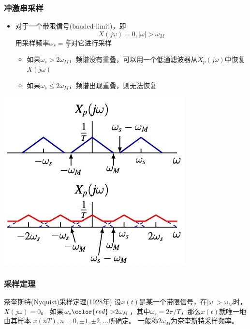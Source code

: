 \documentclass[CJKutf8,xcolor=pdftex,dvipsnames,table]{beamer}
\begin{document}
\begin{CJK*}{UTF8}{song}
  \begin{frame}
    \frametitle{冲激串采样}
    \begin{itemize}
    \item 对于一个带限信号(banded-limit)，即
    \[
    	X(j\omega) = 0, |\omega|>\omega_M
    \]
    用采样频率$\omega_s=\frac{2\pi}{T}$对它进行采样
    	\begin{itemize}
		\item 如果$\omega_s > 2\omega_M$，频谱没有重叠，可以用一个低通滤波器从$X_p(j\omega)$中恢复$X(j\omega)$
		\item 如果$\omega_s \leq 2\omega_M$，频谱出现重叠，则无法恢复
		\end{itemize}
    \end{itemize}
    \begin{center}
      \includegraphics[scale=.4]{overlap}
    \end{center}
  \end{frame}   
     
  \begin{frame}
    \frametitle{采样定理}

	\begin{block}{奈奎斯特(Nyquist)采样定理(1928年)}
		设$x(t)$是某一个带限信号，在$|\omega|>\omega_M$时，$X(j\omega)=0$。
		如果$\omega_s{\color{red}>}2\omega_M$，其中$\omega_s=2\pi/T$，那么$x(t)$就唯一地由其样本
		$x(nT), n=0, \pm1, \pm2, \hdots$所确定。
		一般称$2\omega_M$为奈奎斯特采样频率。
	\end{block}


\end{frame}
\end{CJK*}
\end{document}
